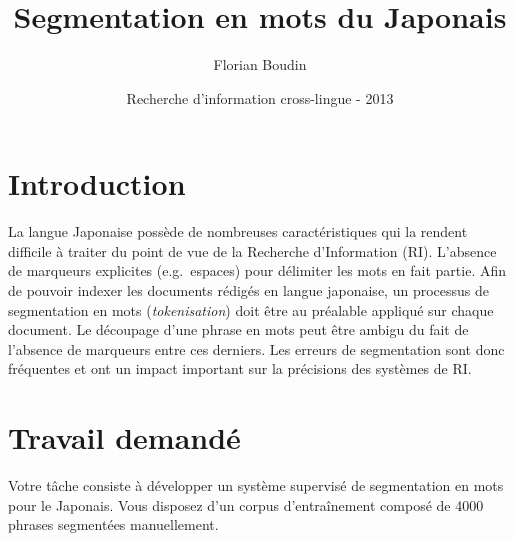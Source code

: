 \documentclass[12pt,a4paper]{article}
\begin{document}
\title{Segmentation en mots du Japonais}
\author{Florian Boudin}
\date{Recherche d'information cross-lingue - 2013}

\maketitle

\section{Introduction}

La langue Japonaise possède de nombreuses caractéristiques qui la rendent difficile à traiter du point de vue de la Recherche d'Information (RI).
L'absence de marqueurs explicites (e.g.~espaces) pour délimiter les mots en fait partie.
Afin de pouvoir indexer les documents rédigés en langue japonaise, un processus de segmentation en mots (\textit{tokenisation}) doit être au préalable appliqué sur chaque document.
Le découpage d'une phrase en mots peut être ambigu du fait de l'absence de marqueurs entre ces derniers.
Les erreurs de segmentation sont donc fréquentes et ont un impact important sur la précisions des systèmes de RI.

\section{Travail demandé}

Votre tâche consiste à développer un système supervisé de segmentation en mots pour le Japonais.
Vous disposez d'un corpus d'entraînement composé de 4000 phrases segmentées manuellement.
\end{document}
